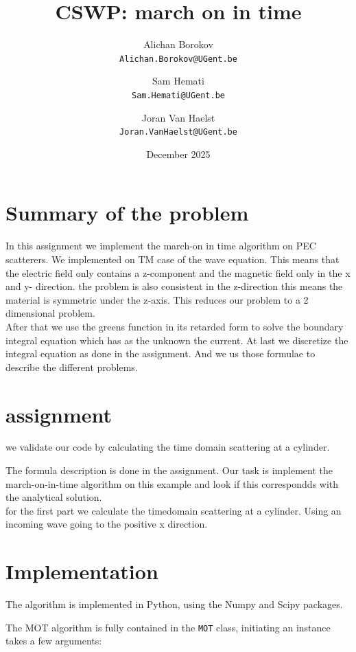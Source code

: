 \documentclass{article}
\title{CSWP: march on in time}
\author{Alichan Borokov \\ \texttt{Alichan.Borokov@UGent.be}
    \and Sam Hemati \\ \texttt{Sam.Hemati@UGent.be}
    \and Joran Van Haelst \\ \texttt{Joran.VanHaelst@UGent.be} }
\date{December 2025}
\begin{document}
\maketitle


\section{Summary of the problem}
In this assignment we implement the march-on in time algorithm on PEC scatterers.
We implemented  on TM case of the wave equation. This means that the electric field only contains a z-component and the magnetic field only in the x and y- direction.
the problem is also consistent in the z-direction this means the material is symmetric under the z-axis.
This reduces our problem to a 2 dimensional problem.\\

After  that we use the greens function in its retarded form to solve the boundary integral equation which has as the unknown the current.
At last we discretize the integral equation as done in the assignment. And we us those formulae to describe the different problems.


\section{assignment}
we validate our code by calculating the time domain scattering at a cylinder.

The formula description is done  in the assignment. Our task is  implement the march-on-in-time algorithm on this example and look if this correspondds with the analytical solution.
\\

for the first part we calculate the timedomain scattering at a cylinder. Using an incoming wave going to the positive x direction.


\section{Implementation}

The algorithm is implemented in Python, using the Numpy and Scipy packages.

The MOT algorithm is fully contained in the \texttt{MOT} class, 
initiating an instance takes a few arguments:
\end{document}
